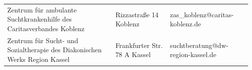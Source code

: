 {\begin{xltabular}{\textwidth} {
 >{\raggedright\arraybackslash}p{5cm}
 >{\raggedright\arraybackslash}X
 >{\raggedright\arraybackslash}p{5cm} }
Zentrum für ambulante Suchtkrankenhilfe des Caritasverbandes Koblenz & Rizzastraße 14 Koblenz & zas\_koblenz@caritas-koblenz.de \\
Zentrum für Sucht- und Sozialtherapie des Diakonischen Werks Region Kassel & Frankfurter Str. 78 A Kassel & suchtberatung@dw-region-kassel.de \\
\bottomrule
\end{xltabular}
}

